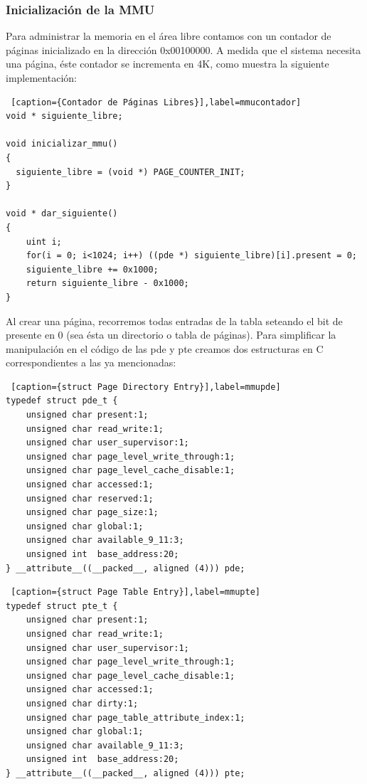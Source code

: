 \subsubsection*{Inicialización de la MMU}

\par Para administrar la memoria en el área libre contamos con un contador de páginas inicializado en la dirección 0x00100000. A medida que el sistema necesita una página,  éste contador se incrementa en 4K, como muestra la siguiente implementación:

\begin{lstlisting} [caption={Contador de Páginas Libres}],label=mmucontador] 
void * siguiente_libre;

void inicializar_mmu()
{
  siguiente_libre = (void *) PAGE_COUNTER_INIT;
}

void * dar_siguiente()
{
    uint i;
    for(i = 0; i<1024; i++) ((pde *) siguiente_libre)[i].present = 0;
    siguiente_libre += 0x1000;
    return siguiente_libre - 0x1000;
}
\end{lstlisting}

\par Al crear una página, recorremos todas entradas de la tabla seteando el bit de presente en 0 (sea ésta un directorio o tabla de páginas). Para simplificar la manipulación en el código de las pde y pte creamos dos estructuras en C correspondientes a las ya mencionadas: 

\begin{lstlisting} [caption={struct Page Directory Entry}],label=mmupde] 
typedef struct pde_t {
    unsigned char present:1;
    unsigned char read_write:1;
    unsigned char user_supervisor:1;
    unsigned char page_level_write_through:1;
    unsigned char page_level_cache_disable:1;
    unsigned char accessed:1;
    unsigned char reserved:1;
    unsigned char page_size:1;
    unsigned char global:1;
    unsigned char available_9_11:3;
    unsigned int  base_address:20;
} __attribute__((__packed__, aligned (4))) pde;
\end{lstlisting}

\begin{lstlisting} [caption={struct Page Table Entry}],label=mmupte] 
typedef struct pte_t {
    unsigned char present:1;
    unsigned char read_write:1;
    unsigned char user_supervisor:1;
    unsigned char page_level_write_through:1;
    unsigned char page_level_cache_disable:1;
    unsigned char accessed:1;
    unsigned char dirty:1;
    unsigned char page_table_attribute_index:1;
    unsigned char global:1;
    unsigned char available_9_11:3;
    unsigned int  base_address:20;
} __attribute__((__packed__, aligned (4))) pte;
\end{lstlisting}

